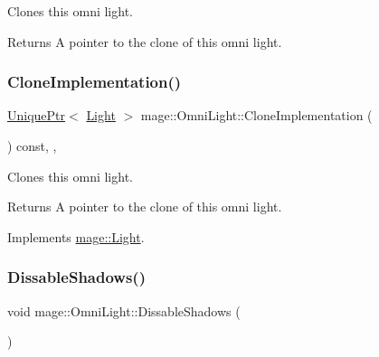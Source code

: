 Clones this omni light.

\begin{DoxyReturn}{Returns}
A pointer to the clone of this omni light. 
\end{DoxyReturn}
\hypertarget{classmage_1_1_omni_light_a1212457828cdd96cc7170767b7bd1223}{}\label{classmage_1_1_omni_light_a1212457828cdd96cc7170767b7bd1223} 
\subsubsection{\texorpdfstring{Clone\+Implementation()}{CloneImplementation()}}
{\footnotesize\ttfamily \hyperlink{namespacemage_a3316d7143a973e37adf1110f2e80ca31}{Unique\+Ptr}$<$ \hyperlink{classmage_1_1_light}{Light} $>$ mage\+::\+Omni\+Light\+::\+Clone\+Implementation (\begin{DoxyParamCaption}{ }\end{DoxyParamCaption}) const\hspace{0.3cm}{\ttfamily [override]}, {\ttfamily [private]}, {\ttfamily [virtual]}}

Clones this omni light.

\begin{DoxyReturn}{Returns}
A pointer to the clone of this omni light. 
\end{DoxyReturn}


Implements \hyperlink{classmage_1_1_light_aa613d76a1ebda69efde853d15f75490c}{mage\+::\+Light}.

\hypertarget{classmage_1_1_omni_light_a2353a53e336ffb55be9949ea6f1d8979}{}\label{classmage_1_1_omni_light_a2353a53e336ffb55be9949ea6f1d8979} 
\subsubsection{\texorpdfstring{Dissable\+Shadows()}{DissableShadows()}}
{\footnotesize\ttfamily void mage\+::\+Omni\+Light\+::\+Dissable\+Shadows (\begin{DoxyParamCaption}{ }\end{DoxyParamCaption})\hspace{0.3cm}{\ttfamily [noexcept]}}

